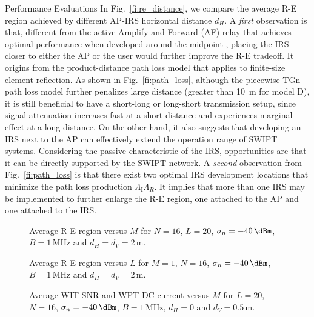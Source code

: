 \documentclass[journal]{IEEEtran}
\begin{document}
\begin{section}{Performance Evaluations}
		In Fig.~\ref{fi:re_distance}, we compare the average R-E region achieved by different AP-IRS horizontal distance $d_H$. A \textit{first} observation is that, different from the active Amplify-and-Forward (AF) relay that achieves optimal performance when developed around the midpoint \cite{Li2017}, placing the IRS closer to either the AP or the user would further improve the R-E tradeoff. It origins from the product-distance path loss model that applies to finite-size element reflection. As shown in Fig.~\ref{fi:path_loss}, although the piecewise TGn path loss model further penalizes large distance (greater than \SI{10}{\meter} for model D), it is still beneficial to have a short-long or long-short transmission setup, since signal attenuation increases fast at a short distance and experiences marginal effect at a long distance. On the other hand, it also suggests that developing an IRS next to the AP can effectively extend the operation range of SWIPT systems. Considering the passive characteristic of the IRS, opportunities are that it can be directly supported by the SWIPT network. A \textit{second} observation from Fig.~\ref{fi:path_loss} is that there exist two optimal IRS development locations that minimize the path loss production $\Lambda_{\text{I}}\Lambda_R$. It implies that more than one IRS may be implemented to further enlarge the R-E region, one attached to the AP and one attached to the IRS.

		\begin{figure}[!t]
			\centering
			\begin{adjustbox}{width=\linewidth}
				
			\end{adjustbox}
			\caption{Average R-E region versus $M$ for $N=16$, $L=20$, $\sigma_n=-40\,\si{\dBm}$, $B=1\,\si{\MHz}$ and $d_H=d_V=2\,\si{\meter}$.}
			\label{fi:re_tx}
		\end{figure}

		\begin{figure}[!t]
			\centering
			\begin{adjustbox}{width=\linewidth}
				
			\end{adjustbox}
			\caption{Average R-E region versus $L$ for $M=1$, $N=16$, $\sigma_n=-40\,\si{\dBm}$, $B=1\,\si{\MHz}$ and $d_H=d_V=2\,\si{\meter}$.}
			\label{fi:re_reflector}
		\end{figure}

		\begin{figure}[!t]
			\centering
			\begin{adjustbox}{width=\linewidth}
				
			\end{adjustbox}
			\caption{Average WIT SNR and WPT DC current versus $M$ for $L=20$, $N=16$, $\sigma_n=-40\,\si{\dBm}$, $B=1\,\si{\MHz}$, $d_H=0$ and $d_V=0.5\,\si{\meter}$.}
			\label{fi:scaling_tx}
		\end{figure}


\end{section}
\end{document}
